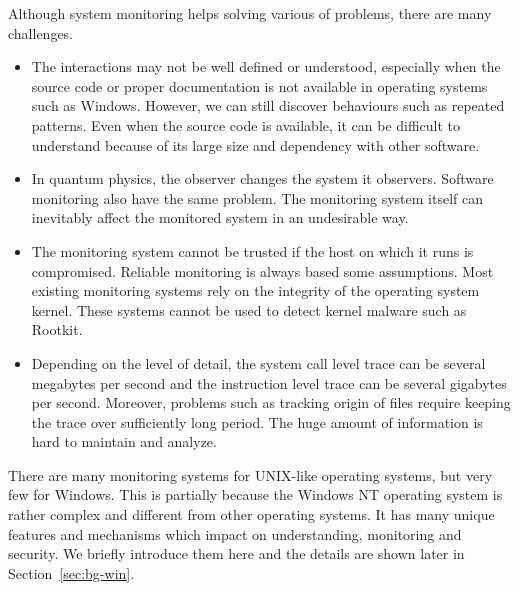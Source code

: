 Although system monitoring helps solving various of problems,
there are many challenges.

\begin{itemize}
\item
The interactions may not be well defined or understood,
especially when the source code or proper documentation is not available
in operating systems such as Windows.
However, we can still discover behaviours such as repeated patterns.
Even when the source code is available, it can be difficult to understand
because of its large size and dependency with other software.
\item
In quantum physics, the observer changes the system it observers.
Software monitoring also have the same problem.
The monitoring system itself can inevitably affect the monitored system
in an undesirable way.
\item
The monitoring system cannot be trusted if the host on which it
runs is compromised.
Reliable monitoring is always based some assumptions.
Most existing monitoring systems rely on the integrity of
the operating system kernel.
These systems cannot be used to detect kernel malware such as Rootkit.
\item
Depending on the level of detail, the system call level trace can be
several megabytes per second and the instruction level trace can be
several gigabytes per second.
Moreover, problems such as tracking origin of files require keeping the trace
over sufficiently long period.
The huge amount of information is hard to maintain and
analyze.
\end{itemize}

There are many monitoring systems for UNIX-like operating systems,
but very few for Windows.
This is partially because
the Windows NT operating system is rather complex and different from other
operating systems.
It has many unique features and mechanisms which impact on understanding,
monitoring and security.
We briefly introduce them here and the details are shown later
in Section~\ref{sec:bg-win}.

